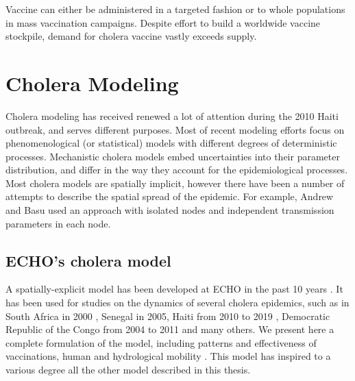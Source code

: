  Vaccine can either be administered in a targeted fashion or to whole populations in mass vaccination campaigns. Despite effort to build a worldwide vaccine stockpile, demand for cholera vaccine vastly exceeds supply\cite{Parker:AdaptingGlobalShortage:2017a,Seidlein:PreventingCholeraOutbreaks:2018}.


\section{Cholera Modeling}
Cholera modeling has received renewed a lot of attention during the 2010 Haiti outbreak, and serves different purposes. 
Most of recent modeling efforts focus on phenomenological (or statistical) models with different degrees of deterministic processes\cite{Azman:UrbanCholeraTransmission:2012,Finger:PotentialImpactCasearea:2018,Camacho:CholeraEpidemicYemen:2018,Lessler:MappingBurdenCholera:2018,Koelle:DisentanglingExtrinsicIntrinsic:2004}. Mechanistic cholera models embed uncertainties into their parameter distribution, and differ in the way they account for the epidemiological processes\cite{Kirpich:ControllingCholeraOuest:2017,Tuite:CholeraEpidemicHaiti:2011,Chao:VaccinationStrategiesEpidemic:2011,Kirpich:CholeraTransmissionOuest:2015}. Most cholera models are spatially implicit, however there have been a number of attempts to describe the spatial spread of the epidemic. For example, Andrew and Basu used an approach with isolated nodes and independent transmission parameters in each node\cite{Andrews:TransmissionDynamicsControl:2011}.

\subsection{ECHO's cholera model}
A spatially-explicit model has been developed at ECHO in the past 10 years \parencite{Bertuzzo:SpacetimeEvolutionCholera:2008}. It has been used for studies on the dynamics of several cholera epidemics, such as in South Africa in 2000 \parencite{Mari:ModellingCholeraEpidemics:2012}, Senegal in 2005, Haiti from 2010 to 2019 \parencite{Bertuzzo:PredictionSpatialEvolution:2011,Bertuzzo:ProbabilityExtinctionHaiti:2016}, Democratic Republic of the Congo from 2004 to 2011 and many others\cite{Finger:PotentialImpactCasearea:2018}.  
We present here a complete formulation of the model, including patterns and effectiveness of vaccinations, human and hydrological mobility \parencite{Bertuzzo:ProbabilityExtinctionHaiti:2016,Pasetto:RealtimeForecastingCholera:2018}. This model has inspired to a various degree all the other model described in this thesis.

